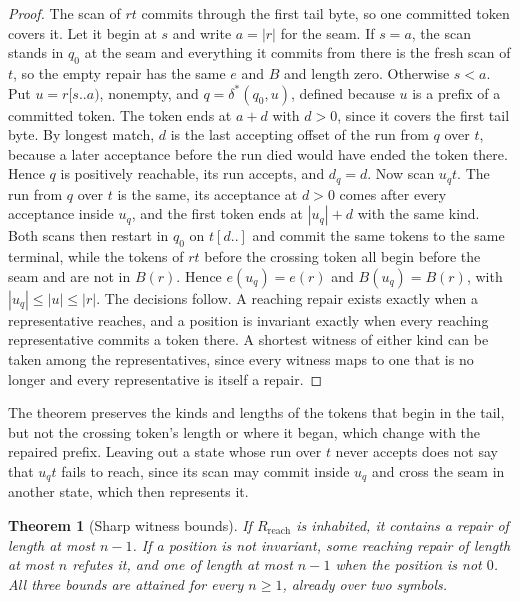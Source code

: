 \documentclass[11pt,a4paper]{article}
\theoremstyle{definition}
\theoremstyle{plain}
\newtheorem{theorem}{Theorem}
\theoremstyle{remark}
\newcommand{\Rreach}{R_{\mathrm{reach}}}
\newcommand{\suffix}[2]{#1[#2..]}
\begin{document}
\begin{proof}
The scan of $rt$ commits through the first tail byte, so one committed token covers it. Let it begin at $s$ and write
$a = |r|$ for the seam. If $s = a$, the scan stands in $q_0$ at the seam and everything it commits from there is the
fresh scan of $t$, so the empty repair has the same $e$ and $B$ and length zero. Otherwise $s < a$. Put $u = r[s..a)$,
nonempty, and $q = \delta^*(q_0, u)$, defined because $u$ is a prefix of a committed token. The token ends at $a + d$
with $d > 0$, since it covers the first tail byte. By longest match, $d$ is the last accepting offset of the run from
$q$ over $t$, because a later acceptance before the run died would have ended the token there. Hence $q$ is positively
reachable, its run accepts, and $d_q = d$. Now scan $u_q t$. The run from $q$ over $t$ is the same, its acceptance at
$d > 0$ comes after every acceptance inside $u_q$, and the first token ends at $|u_q| + d$ with the same kind. Both
scans then restart in $q_0$ on $\suffix{t}{d}$ and commit the same tokens to the same terminal, while the tokens of $rt$
before the crossing token all begin before the seam and are not in $B(r)$. Hence $e(u_q) = e(r)$ and $B(u_q) = B(r)$,
with $|u_q| \le |u| \le |r|$. The decisions follow. A reaching repair exists exactly when a representative reaches, and
a position is invariant exactly when every reaching representative commits a token there. A shortest witness of either
kind can be taken among the representatives, since every witness maps to one that is no longer and every representative
is itself a repair.
\end{proof}

The theorem preserves the kinds and lengths of the tokens that begin in the tail, but not the crossing token's length or
where it began, which change with the repaired prefix. Leaving out a state whose run over $t$ never accepts does not say
that $u_q t$ fails to reach, since its scan may commit inside $u_q$ and cross the seam in another state, which then
represents it.

\begin{theorem}[Sharp witness bounds]
\label{thm:bounds}
If $\Rreach$ is inhabited, it contains a repair of length at most $n - 1$. If a position is not invariant, some reaching
repair of length at most $n$ refutes it, and one of length at most $n - 1$ when the position is not $0$. All three
bounds are attained for every $n \ge 1$, already over two symbols.
\end{theorem}
\end{document}
